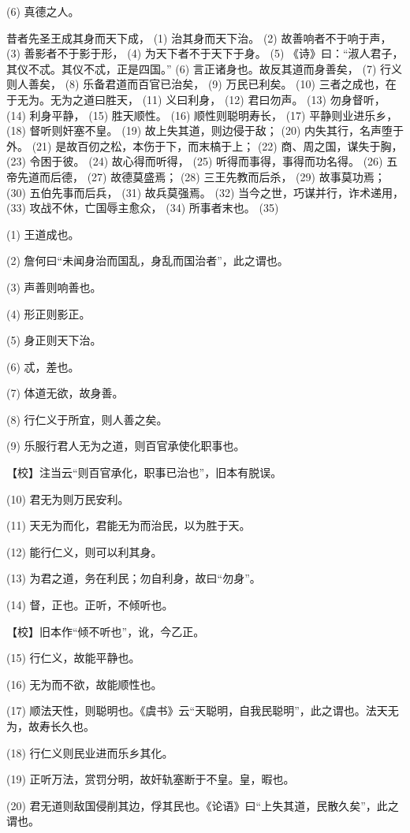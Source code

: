 \documentclass[12pt,UTF8]{ctexbook}
\begin{document}
(6) 真德之人。

昔者先圣王成其身而天下成， (1) 治其身而天下治。 (2) 故善响者不于响于声， (3) 善影者不于影于形， (4) 为天下者不于天下于身。 (5) 《诗》曰：“淑人君子，其仪不忒。其仪不忒，正是四国。” (6) 言正诸身也。故反其道而身善矣， (7) 行义则人善矣， (8) 乐备君道而百官已治矣， (9) 万民已利矣。 (10) 三者之成也，在于无为。无为之道曰胜天， (11) 义曰利身， (12) 君曰勿声。 (13) 勿身督听， (14) 利身平静， (15) 胜天顺性。 (16) 顺性则聪明寿长， (17) 平静则业进乐乡， (18) 督听则奸塞不皇。 (19) 故上失其道，则边侵于敌； (20) 内失其行，名声堕于外。 (21) 是故百仞之松，本伤于下，而末槁于上； (22) 商、周之国，谋失于胸， (23) 令困于彼。 (24) 故心得而听得， (25) 听得而事得，事得而功名得。 (26) 五帝先道而后德， (27) 故德莫盛焉； (28) 三王先教而后杀， (29) 故事莫功焉； (30) 五伯先事而后兵， (31) 故兵莫强焉。 (32) 当今之世，巧谋并行，诈术递用， (33) 攻战不休，亡国辱主愈众， (34) 所事者末也。 (35)

(1) 王道成也。

(2) 詹何曰“未闻身治而国乱，身乱而国治者”，此之谓也。

(3) 声善则响善也。

(4) 形正则影正。

(5) 身正则天下治。

(6) 忒，差也。

(7) 体道无欲，故身善。

(8) 行仁义于所宜，则人善之矣。

(9) 乐服行君人无为之道，则百官承使化职事也。

【校】注当云“则百官承化，职事已治也”，旧本有脱误。

(10) 君无为则万民安利。

(11) 天无为而化，君能无为而治民，以为胜于天。

(12) 能行仁义，则可以利其身。

(13) 为君之道，务在利民；勿自利身，故曰“勿身”。

(14) 督，正也。正听，不倾听也。

【校】旧本作“倾不听也”，讹，今乙正。

(15) 行仁义，故能平静也。

(16) 无为而不欲，故能顺性也。

(17) 顺法天性，则聪明也。《虞书》云“天聪明，自我民聪明”，此之谓也。法天无为，故寿长久也。

(18) 行仁义则民业进而乐乡其化。

(19) 正听万法，赏罚分明，故奸轨塞断于不皇。皇，暇也。

(20) 君无道则敌国侵削其边，俘其民也。《论语》曰“上失其道，民散久矣”，此之谓也。
\end{document}
